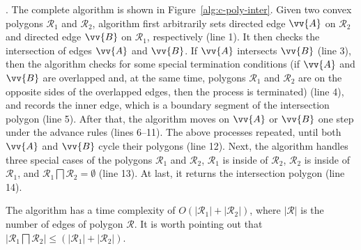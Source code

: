 . The complete algorithm is shown in Figure~\ref{alg:c-poly-inter}.
Given two convex polygons $\mathcal{R}_1$ and $\mathcal{R}_2$, algorithm \cpia first arbitrarily sets directed edge $\vv{A}$ on $\mathcal{R}_2$ and directed edge $\vv{B}$ on $\mathcal{R}_1$, respectively (line 1).
%
It then checks the intersection of edges $\vv{A}$ and $\vv{B}$. If $\vv{A}$ intersects $\vv{B}$ (line 3), then the algorithm checks for some special termination conditions (\eg if $\vv{A}$ and $\vv{B}$ are overlapped and, at the same time, polygons $\mathcal{R}_1$ and $\mathcal{R}_2$ are on the opposite sides of the overlapped edges, then the process is terminated) (line 4), and records the inner edge, which is a boundary segment of the intersection polygon (line 5).
After that, the algorithm moves on $\vv{A}$ or $\vv{B}$ one step under the advance rules (lines 6--11).
The above processes repeated, until both $\vv{A}$ and $\vv{B}$ cycle their polygons (line 12).
%
Next, the algorithm handles three special cases of the polygons $\mathcal{R}_1$ and $\mathcal{R}_2$, \ie $\mathcal{R}_1$ is inside of $\mathcal{R}_2$, $\mathcal{R}_2$ is inside of $\mathcal{R}_1$, and $\mathcal{R}_1 \bigsqcap \mathcal{R}_2 = \emptyset$ (line 13).
%
At last, it returns the intersection polygon (line 14).


The algorithm has a time complexity of $O(|\mathcal{R}_1| + |\mathcal{R}_2|)$, where $|\mathcal{R}|$ is the number of edges of polygon $\mathcal{R}$.
It is worth pointing out that $|\mathcal{R}_1 \bigsqcap \mathcal{R}_2| \le (|\mathcal{R}_1| + |\mathcal{R}_2|)$.


